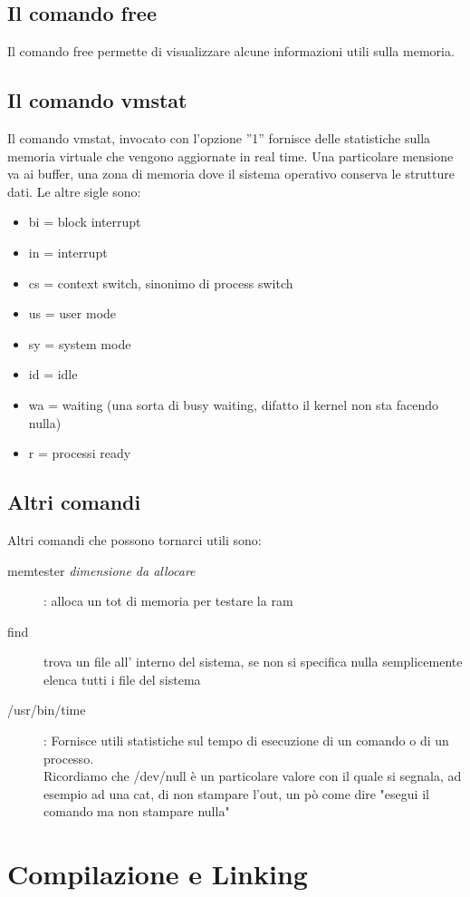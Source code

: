 \documentclass[a4paper,12pt]{article} %
\begin{document}
\subsection{Il comando free}
Il comando free permette di visualizzare alcune informazioni utili sulla memoria.
\subsection{Il comando vmstat}
Il comando vmstat, invocato con l'opzione ''1'' fornisce delle statistiche sulla memoria virtuale che vengono aggiornate in real time. Una particolare mensione va ai buffer, una zona di memoria dove il sistema
operativo conserva le strutture dati. Le altre sigle sono:\\
\begin{itemize}
\item bi = block interrupt
\item in = interrupt
\item cs = context switch, sinonimo di process switch
\item us = user mode
\item sy = system mode
\item id = idle
\item wa = waiting (una sorta di busy waiting, difatto il kernel non sta facendo nulla)
\item r = processi ready
\end{itemize}
\subsection{Altri comandi}
Altri comandi che possono tornarci utili sono:
\begin{description}
\item[ memtester \textit{dimensione da allocare}] : alloca un tot di memoria per testare la ram
\item[find] trova un file all' interno del sistema, se non si specifica nulla semplicemente elenca tutti i file del sistema
\item[/usr/bin/time]: Fornisce utili statistiche sul tempo di esecuzione di un comando o di un processo.\\
Ricordiamo che /dev/null è un particolare valore con il quale si segnala, ad esempio ad una cat, di non stampare l'out, un pò come dire "esegui il comando ma non stampare nulla" 
\end{description}

\section{Compilazione e Linking}
\end{document}
